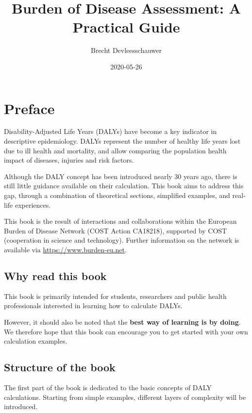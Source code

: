 \documentclass[]{book}
\title{Burden of Disease Assessment: A Practical Guide}
\author{Brecht Devleesschauwer}
\date{2020-05-26}
\begin{document}
\maketitle

{
\setcounter{tocdepth}{1}
\tableofcontents
}
\chapter*{Preface}\label{preface}

Disability-Adjusted Life Years (DALYs) have become a key indicator in
descriptive epidemiology. DALYs represent the number of healthy life
years lost due to ill health and mortality, and allow comparing the
population health impact of diseases, injuries and risk factors.

Although the DALY concept has been introduced nearly 30 years ago, there
is still little guidance available on their calculation. This book aims
to address this gap, through a combination of theoretical sections,
simplified examples, and real-life experiences.

This book is the result of interactions and collaborations within the
European Burden of Disease Network (COST Action CA18218), supported by
COST (cooperation in science and technology). Further information on the
network is available via \url{https://www.burden-eu.net}.

\section*{Why read this book}\label{why-read-this-book}

This book is primarily intended for students, researchers and public
health professionals interested in learning how to calculate DALYs.

However, it should also be noted that the \textbf{best way of learning
is by doing}. We therefore hope that this book can encourage you to get
started with your own calculation examples.

\section*{Structure of the book}\label{structure-of-the-book}

The first part of the book is dedicated to the basic concepts of DALY
calculations. Starting from simple examples, different layers of
complexity will be introduced.
\end{document}
